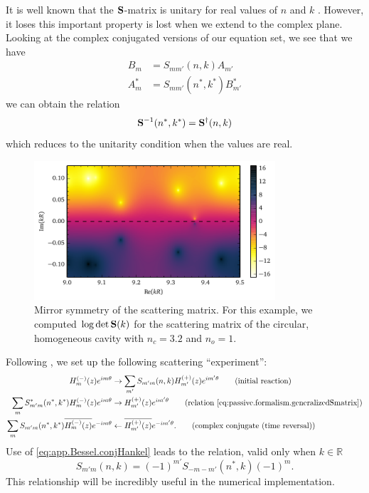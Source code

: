 It is well known that the $\mathbf{S}$-matrix is unitary 
for real values of $n$ and $k$ \cite{NEW1982}. However, 
it loses this important property is lost when we extend
to the complex plane. Looking at the complex conjugated versions
of our equation set, we see that we have
  \begin{align*}
    B_m		&= S_{mm'}(n,k)A_{m'}	\\
    A_m^*	&= S_{mm'}(n^*,k^*)B_{m'}^*
  \end{align*}
we can obtain the relation
  \begin{equation}
    \label{eq:passive.formalism.generalizedSmatrix}
    \mathbf{S}^{-1}(n^*,k^*) = \mathbf{S}^\dagger(n,k)
  \end{equation}
which reduces to the unitarity condition when 
the values are real. 

\begin{figure}
 \centering
 \includegraphics[width=0.8\textwidth]{figs/passive/determinantSmatrix.pdf}
 \caption[Mirror symmetry of the scattering matrix]
	 {Mirror symmetry of the scattering matrix. For this example, 
	 we computed $\log\det\mathbf{S}(k)$ for the scattering matrix of the
	 circular, homogeneous cavity with $n_c=3.2$ and $n_o=1$.}
  \label{fig:passive.formalism.symmetrySmatrix}
\end{figure}

Following \cite{GAP2013a}, we set up the following scattering
``experiment'':
  \begin{align*}
    H_m^{(-)}(z)e^{im\theta}					&\rightarrow \sum_{m'} S_{m'm}(n,k)H_{m'}^{(+)}(z)e^{im'\theta}	\tag{initial reaction}\\
    \sum_{m}S_{m'm}^*(n^*,k^*)H_m^{(-)}(z)e^{im\theta}		&\rightarrow H_{m'}^{(+)}(z)e^{im'\theta}			\tag{relation \eqref{eq:passive.formalism.generalizedSmatrix}}\\
    \sum_{m}S_{m'm}(n^*,k^*)\overline{H_m^{(-)}(z)}e^{-im\theta}&\leftarrow \overline{H_{m'}^{(+)}(z)}e^{-im'\theta}.		\tag{complex conjugate (time reversal)}
  \end{align*}
Use of \eqref{eq:app.Bessel.conjHankel}
leads to the relation, valid only when $k\in\mathbb{R}$
  \begin{equation}
    \label{eq:passive.formalism.timeReversalSymmetryReal}
    S_{m'm}(n,k) = (-1)^{m'}S_{-m-m'}(n^*,k)(-1)^m.
  \end{equation}
This relationship will be incredibly useful in the numerical implementation.

